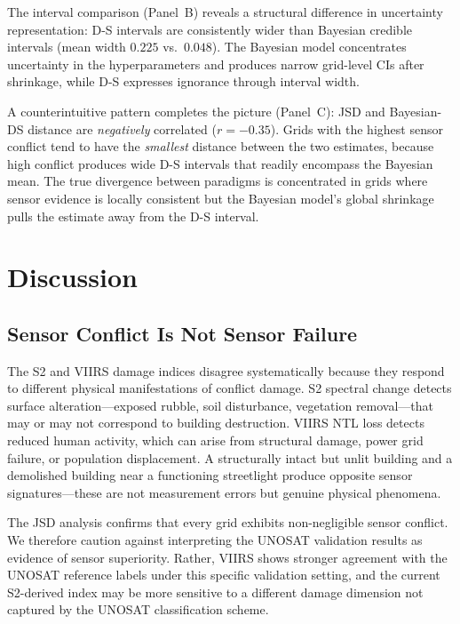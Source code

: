 \documentclass[wcp]{jmlr}
\begin{document}
The interval comparison (Panel~B) reveals a structural difference in
uncertainty representation: D-S intervals are consistently wider than
Bayesian credible intervals (mean width $0.225$ vs.\ $0.048$). The
Bayesian model concentrates uncertainty in the hyperparameters and produces
narrow grid-level CIs after shrinkage, while D-S expresses ignorance
through interval width.

A counterintuitive pattern completes the picture (Panel~C): JSD and
Bayesian-DS distance are \emph{negatively} correlated ($r = -0.35$). Grids
with the highest sensor conflict tend to have the \emph{smallest} distance
between the two estimates, because high conflict produces wide D-S
intervals that readily encompass the Bayesian mean. The true divergence
between paradigms is concentrated in grids where sensor evidence is locally
consistent but the Bayesian model's global shrinkage pulls the estimate
away from the D-S interval.

\section{Discussion}\label{sec:discussion}

\subsection{Sensor Conflict Is Not Sensor Failure}

The S2 and VIIRS damage indices disagree systematically because they
respond to different physical manifestations of conflict damage. S2
spectral change detects surface alteration---exposed rubble, soil
disturbance, vegetation removal---that may or may not correspond to
building destruction. VIIRS NTL loss detects reduced human activity, which
can arise from structural damage, power grid failure, or population
displacement. A structurally intact but unlit building and a demolished
building near a functioning streetlight produce opposite sensor
signatures---these are not measurement errors but genuine physical
phenomena.

The JSD analysis confirms that every grid exhibits non-negligible sensor
conflict. We therefore caution against interpreting the UNOSAT validation
results as evidence of sensor superiority. Rather, VIIRS shows stronger
agreement with the UNOSAT reference labels under this specific validation
setting, and the current S2-derived index may be more sensitive to a
different damage dimension not captured by the UNOSAT classification
scheme.
\end{document}
